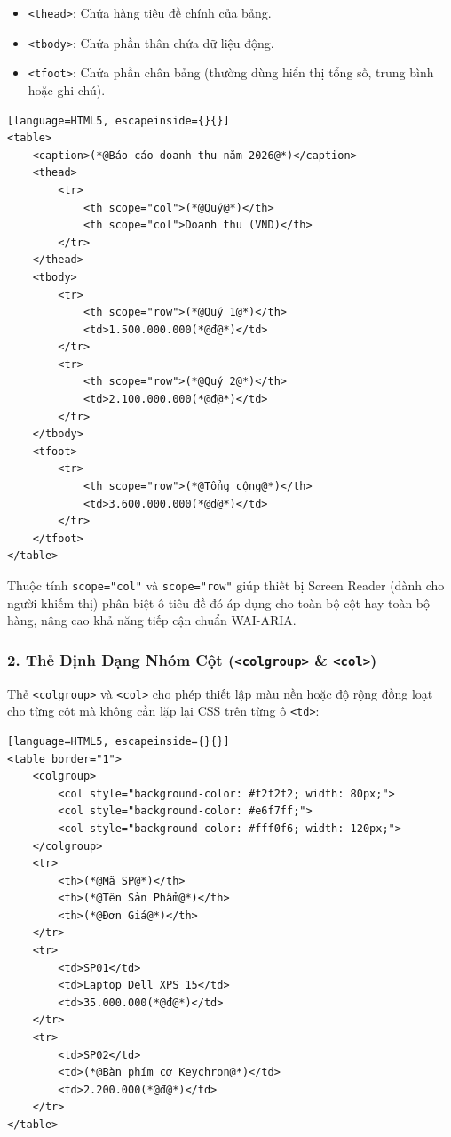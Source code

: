 \documentclass[11pt,oneside]{book}
\newcommand{\codeinline}[1]{\textcolor{accentOrange}{\texttt{#1}}}
\begin{document}
\begin{itemize}[leftmargin=1.8em, itemsep=2pt, parsep=0pt]
    \item \codeinline{<thead>}: Chứa hàng tiêu đề chính của bảng.
    \item \codeinline{<tbody>}: Chứa phần thân chứa dữ liệu động.
    \item \codeinline{<tfoot>}: Chứa phần chân bảng (thường dùng hiển thị tổng số, trung bình hoặc ghi chú).
\end{itemize}

\begin{codeWindow}
\begin{lstlisting}[language=HTML5, escapeinside={}{}]
<table>
    <caption>(*@Báo cáo doanh thu năm 2026@*)</caption>
    <thead>
        <tr>
            <th scope="col">(*@Quý@*)</th>
            <th scope="col">Doanh thu (VND)</th>
        </tr>
    </thead>
    <tbody>
        <tr>
            <th scope="row">(*@Quý 1@*)</th>
            <td>1.500.000.000(*@đ@*)</td>
        </tr>
        <tr>
            <th scope="row">(*@Quý 2@*)</th>
            <td>2.100.000.000(*@đ@*)</td>
        </tr>
    </tbody>
    <tfoot>
        <tr>
            <th scope="row">(*@Tổng cộng@*)</th>
            <td>3.600.000.000(*@đ@*)</td>
        </tr>
    </tfoot>
</table>
\end{lstlisting}
\end{codeWindow}

Thuộc tính \codeinline{scope="col"} và \codeinline{scope="row"} giúp thiết bị Screen Reader (dành cho người khiếm thị) phân biệt ô tiêu đề đó áp dụng cho toàn bộ cột hay toàn bộ hàng, nâng cao khả năng tiếp cận chuẩn WAI-ARIA.

\subsubsection{2. Thẻ Định Dạng Nhóm Cột (\codeinline{<colgroup>} \& \codeinline{<col>})}

Thẻ \codeinline{<colgroup>} và \codeinline{<col>} cho phép thiết lập màu nền hoặc độ rộng đồng loạt cho từng cột mà không cần lặp lại CSS trên từng ô \codeinline{<td>}:

\begin{codeWindow}
\begin{lstlisting}[language=HTML5, escapeinside={}{}]
<table border="1">
    <colgroup>
        <col style="background-color: #f2f2f2; width: 80px;">
        <col style="background-color: #e6f7ff;">
        <col style="background-color: #fff0f6; width: 120px;">
    </colgroup>
    <tr>
        <th>(*@Mã SP@*)</th>
        <th>(*@Tên Sản Phẩm@*)</th>
        <th>(*@Đơn Giá@*)</th>
    </tr>
    <tr>
        <td>SP01</td>
        <td>Laptop Dell XPS 15</td>
        <td>35.000.000(*@đ@*)</td>
    </tr>
    <tr>
        <td>SP02</td>
        <td>(*@Bàn phím cơ Keychron@*)</td>
        <td>2.200.000(*@đ@*)</td>
    </tr>
</table>
\end{lstlisting}
\end{codeWindow}
\end{document}
